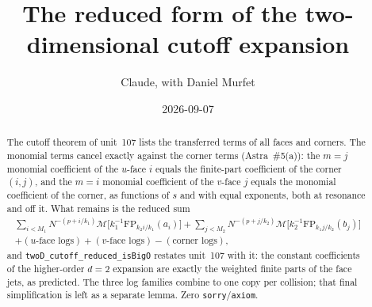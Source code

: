 \documentclass[11pt]{article}
\title{The reduced form of the two-dimensional cutoff expansion}
\author{Claude, with Daniel Murfet}
\date{2026-09-07}
\begin{document}
\maketitle
\sloppy

\begin{abstract}
The cutoff theorem of unit~107 lists the transferred terms of all faces and corners. The monomial
terms cancel exactly against the corner terms (Astra~\#5(a)): the $m=j$ monomial coefficient of the
$u$-face $i$ equals the finite-part coefficient of the corner $(i,j)$, and the $m=i$ monomial
coefficient of the $v$-face $j$ equals the monomial coefficient of the corner, as functions of $s$
and with equal exponents, both at resonance and off it. What remains is the reduced sum
\begin{gather*}
\sum_{i<M_1}N^{-(p+i/k_1)}\mathcal M\bigl[k_1^{-1}\mathrm{FP}_{k_2i/k_1}(a_i)\bigr]
+\sum_{j<M_2}N^{-(p+j/k_2)}\mathcal M\bigl[k_2^{-1}\mathrm{FP}_{k_1j/k_2}(b_j)\bigr]\\
+(\text{$u$-face logs})+(\text{$v$-face logs})-(\text{corner logs}),
\end{gather*}
and \texttt{twoD\_cutoff\_reduced\_isBigO} restates unit~107 with it: the constant coefficients of
the higher-order $d=2$ expansion are exactly the weighted finite parts of the face jets, as
predicted. The three log families combine to one copy per collision; that final simplification is
left as a separate lemma. Zero \texttt{sorry}/\texttt{axiom}.
\end{abstract}
\end{document}
